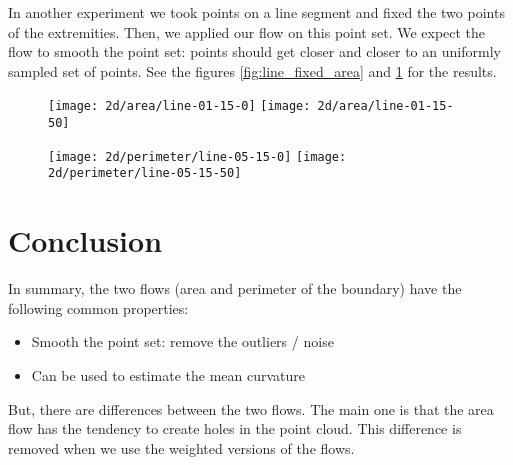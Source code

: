 
In another experiment we took points on a line segment and fixed the two points
of the extremities. Then, we applied our flow on this point set. We expect the
flow to smooth the point set: points should get closer and closer to an
uniformly sampled set of points. See the figures \ref{fig:line_fixed_area} and
\ref{fig:line_fixed_perimeter} for the results.

\begin{figure}[h]
    \centering

    \texttt{[image: 2d/area/line-01-15-0]}
    \texttt{[image: 2d/area/line-01-15-50]}
    \label{fig:line_fixed_area}

    \texttt{[image: 2d/perimeter/line-05-15-0]}
    \texttt{[image: 2d/perimeter/line-05-15-50]}
    \label{fig:line_fixed_perimeter}
\end{figure}


\section{Conclusion}

In summary, the two flows (area and perimeter of the boundary) have the
following common properties:
\begin{itemize}
    \item Smooth the point set: remove the outliers / noise
    \item Can be used to estimate the mean curvature
\end{itemize}

But, there are differences between the two flows. The main one is that the area
flow has the tendency to create holes in the point cloud. This difference is
removed when we use the weighted versions of the flows.






